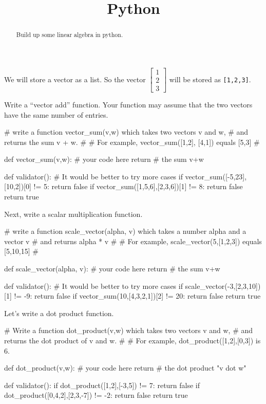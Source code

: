 \documentclass{ximera}
\title{Python}
\begin{document}
\begin{abstract}
  Build up some linear algebra in python.
\end{abstract}

We will store a vector as a list.  So the vector $\begin{bmatrix} 1 \\
  2 \\ 3\end{bmatrix}$ will be stored as \verb|[1,2,3]|.

\begin{exercise}
  Write a ``vector add'' function.  Your function may assume that the
  two vectors have the same number of entries.

\begin{solution}
\begin{python}
# write a function vector_sum(v,w) which takes two vectors v and w,
# and returns the sum v + w.
#
# For example, vector_sum([1,2], [4,1]) equals [5,3]
#
		
def vector_sum(v,w):
  # your code here
  return # the sum v+w

def validator():
  # It would be better to try more cases
  if vector_sum([-5,23],[10,2])[0] != 5:
    return false
  if vector_sum([1,5,6],[2,3,6])[1] != 8:
    return false
  return true

\end{python}
\end{solution}

Next, write a scalar multiplication function.

\begin{solution}
\begin{python}
# write a function scale_vector(alpha, v) which takes a number alpha and a vector v
# and returns alpha * v
#
# For example, scale_vector(5,[1,2,3]) equals [5,10,15]
#
		
def scale_vector(alpha, v):
  # your code here
  return # the sum v+w

def validator():
  # It would be better to try more cases
  if scale_vector(-3,[2,3,10])[1] != -9:
    return false
  if vector_sum(10,[4,3,2,1])[2] != 20:
    return false
  return true

\end{python}
\end{solution}

Let's write a dot product function.

\begin{solution}
\begin{python}
# Write a function dot_product(v,w) which takes two vectors v and w,
# and returns the dot product of v and w.
#
# For example, dot_product([1,2],[0,3]) is 6.
		
def dot_product(v,w):
  # your code here
  return # the dot product "v dot w"

def validator():
  if dot_product([1,2],[-3,5]) != 7:
    return false
  if dot_product([0,4,2],[2,3,-7]) != -2:
    return false
  return true
\end{python}
\end{solution}

\end{exercise}
\end{document}
